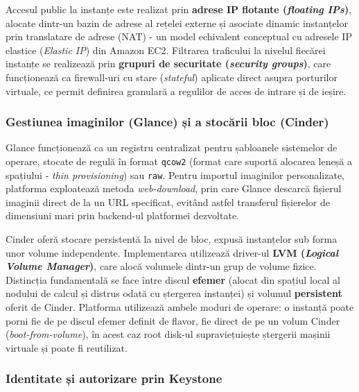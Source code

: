 Accesul public la instanțe este realizat prin \textbf{adrese IP flotante (\textit{floating IPs})}, alocate dintr-un bazin de adrese al rețelei externe și asociate dinamic instanțelor prin translatare de adrese (NAT) - un model echivalent conceptual cu adresele IP elastice (\textit{Elastic IP}) din Amazon EC2. Filtrarea traficului la nivelul fiecărei instanțe se realizează prin \textbf{grupuri de securitate (\textit{security groups})}, care funcționează ca firewall-uri cu stare (\textit{stateful}) aplicate direct asupra porturilor virtuale, ce permit definirea granulară a regulilor de acces de intrare și de ieșire.

\subsubsection{Gestiunea imaginilor (Glance) și a stocării bloc (Cinder)}

Glance funcționează ca un registru centralizat pentru șabloanele sistemelor de operare, stocate de regulă în format \texttt{qcow2} (format care suportă alocarea leneșă a spațiului - \textit{thin provisioning}) sau \texttt{raw}. Pentru importul imaginilor personalizate, platforma exploatează metoda \textit{web-download}, prin care Glance descarcă fișierul imaginii direct de la un URL specificat, evitând astfel transferul fișierelor de dimensiuni mari prin backend-ul platformei dezvoltate.

Cinder oferă stocare persistentă la nivel de bloc, expusă instanțelor sub forma unor volume independente. Implementarea utilizează driver-ul \textbf{LVM (\textit{Logical Volume Manager})}, care alocă volumele dintr-un grup de volume fizice. Distincția fundamentală se face între discul \textbf{efemer} (alocat din spațiul local al nodului de calcul și distrus odată cu ștergerea instanței) și volumul \textbf{persistent} oferit de Cinder. Platforma utilizează ambele moduri de operare: o instanță poate porni fie de pe discul efemer definit de flavor, fie direct de pe un volum Cinder (\textit{boot-from-volume}), în acest caz root disk-ul supraviețuiește ștergerii mașinii virtuale și poate fi reutilizat.

\subsubsection{Identitate și autorizare prin Keystone}

